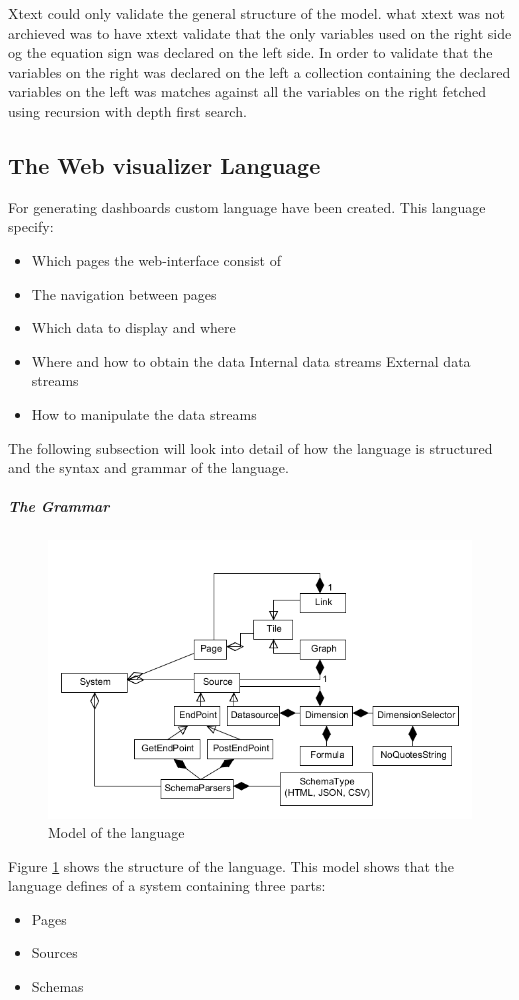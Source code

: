 Xtext could only validate the general structure of the model.
what xtext was not archieved was to have xtext validate that the only variables used
on the right side og the equation sign was declared on the left side.
In order to validate that the variables on the right was declared on the left a
collection containing the declared variables on the left was matches against all the variables
on the right fetched using recursion with depth first search.

\subsection{The Web visualizer Language}
For generating dashboards custom language have been created.
This language specify:
\begin{itemize}
\item Which pages the web-interface consist of
\item The navigation between pages
\item Which data to display and where
\item Where and how to obtain the data
\subitem Internal data streams
\subitem External data streams
\item How to manipulate the data streams
\end{itemize}
The following subsection will look into detail of how the language is structured and the syntax and grammar of the language.

\subparagraph{The Grammar}
\begin{figure}
\begin{center}
\includegraphics[width=\linewidth]{images/languagemodel}
\end{center}
\caption{Model of the language}
\label{fig:languagemodel}
\end{figure}
Figure \ref{fig:languagemodel} shows the structure of the language.
This model shows that the language defines of a system containing three parts:
\begin{itemize}
\item Pages
\item Sources
\item Schemas
\end{itemize}

